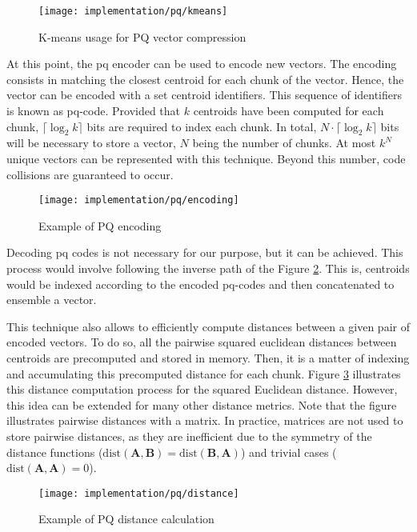 \documentclass[../main.tex]{subfiles}
\begin{document}
\begin{figure}[htbp]
    \centering
    \texttt{[image: implementation/pq/kmeans]}
    \caption{K-means usage for PQ vector compression}
    \label{fig:4:pq_kmeans}
\end{figure}

At this point, the \gls{pq} encoder can be used to encode new vectors. The encoding consists in matching the closest centroid for each chunk of the vector. Hence, the vector can be encoded with a set centroid identifiers. This sequence of identifiers is known as \gls{pq}-code\cite{chang2022a}. Provided that $k$ centroids have been computed for each chunk, $\lceil \log_2 k \rceil$ bits are required to index each chunk. In total, $N \cdot \lceil \log_2 k \rceil$ bits will be necessary to store a vector, $N$ being the number of chunks\cite{briggs2022}. At most $k^N$ unique vectors can be represented with this technique. Beyond this number, code collisions are guaranteed to occur.

\begin{figure}[htbp]
    \centering
    \texttt{[image: implementation/pq/encoding]}
    \caption{Example of PQ encoding}
    \label{fig:4:pq_encoding}
\end{figure}

Decoding \gls{pq} codes is not necessary for our purpose, but it can be achieved. This process would involve following the inverse path of the Figure \ref{fig:4:pq_encoding}. This is, centroids would be indexed according to the encoded \gls{pq}-codes and then concatenated to ensemble a vector.

This technique also allows to efficiently compute distances between a given pair of encoded vectors. To do so, all the pairwise squared euclidean distances between centroids are precomputed and stored in memory. Then, it is a matter of indexing and accumulating this precomputed distance for each chunk. Figure \ref{fig:4:pq_distance} illustrates this distance computation process for the squared Euclidean distance. However, this idea can be extended for many other distance metrics. Note that the figure illustrates pairwise distances with a matrix. In practice, matrices are not used to store pairwise distances, as they are inefficient due to the symmetry of the distance functions ($\text{dist}(\bm{A}, \bm{B}) = \text{dist}(\bm{B}, \bm{A})$) and trivial cases ($\text{dist}(\bm{A}, \bm{A}) = 0$).  

\begin{figure}[htbp]
    \centering
    \texttt{[image: implementation/pq/distance]}
    \caption{Example of PQ distance calculation}
    \label{fig:4:pq_distance}
\end{figure}
\end{document}
